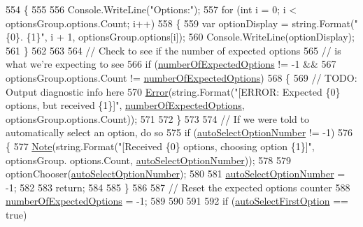 \begin{DoxyCode}
554             \{
555 
556                 Console.WriteLine(\textcolor{stringliteral}{"Options:"});
557                 \textcolor{keywordflow}{for} (\textcolor{keywordtype}{int} i = 0; i < optionsGroup.options.Count; i++)
558                 \{
559                     var optionDisplay = string.Format(\textcolor{stringliteral}{"\{0\}. \{1\}"}, i + 1, optionsGroup.options[i]);
560                     Console.WriteLine(optionDisplay);
561                 \}
562 
563 
564                 \textcolor{comment}{// Check to see if the number of expected options}
565                 \textcolor{comment}{// is what we're expecting to see}
566                 \textcolor{keywordflow}{if} (\hyperlink{a00050_a2e17937195ecd64d5d867d958c45d2c3}{numberOfExpectedOptions} != -1 &&
567                     optionsGroup.options.Count != \hyperlink{a00050_a2e17937195ecd64d5d867d958c45d2c3}{numberOfExpectedOptions})
568                 \{
569                     \textcolor{comment}{// TODO: Output diagnostic info here}
570                     \hyperlink{a00189_a2f63f9f5b7634cb50ee75ff2eb18b137}{Error}(\textcolor{keywordtype}{string}.Format(\textcolor{stringliteral}{"[ERROR: Expected \{0\} options, but received \{1\}]"}, 
      \hyperlink{a00050_a2e17937195ecd64d5d867d958c45d2c3}{numberOfExpectedOptions}, optionsGroup.options.Count));
571 
572                 \}
573 
574                 \textcolor{comment}{// If we were told to automatically select an option, do so}
575                 \textcolor{keywordflow}{if} (\hyperlink{a00050_a34886671e91a1bf3fc225eeb67baced1}{autoSelectOptionNumber} != -1)
576                 \{
577                     \hyperlink{a00189_a939cc9e943c574b36c6af93e9c772702}{Note}(\textcolor{keywordtype}{string}.Format(\textcolor{stringliteral}{"[Received \{0\} options, choosing option \{1\}]"}, optionsGroup.
      options.Count, \hyperlink{a00050_a34886671e91a1bf3fc225eeb67baced1}{autoSelectOptionNumber}));
578 
579                     optionChooser(\hyperlink{a00050_a34886671e91a1bf3fc225eeb67baced1}{autoSelectOptionNumber});
580 
581                     \hyperlink{a00050_a34886671e91a1bf3fc225eeb67baced1}{autoSelectOptionNumber} = -1;
582 
583                     \textcolor{keywordflow}{return};
584 
585                 \}
586 
587                 \textcolor{comment}{// Reset the expected options counter}
588                 \hyperlink{a00050_a2e17937195ecd64d5d867d958c45d2c3}{numberOfExpectedOptions} = -1;
589 
590 
591 
592                 \textcolor{keywordflow}{if} (\hyperlink{a00050_a09a552ee9ff58cb3c995f8ecba1592b6}{autoSelectFirstOption} == \textcolor{keyword}{true})

\end{DoxyCode}

